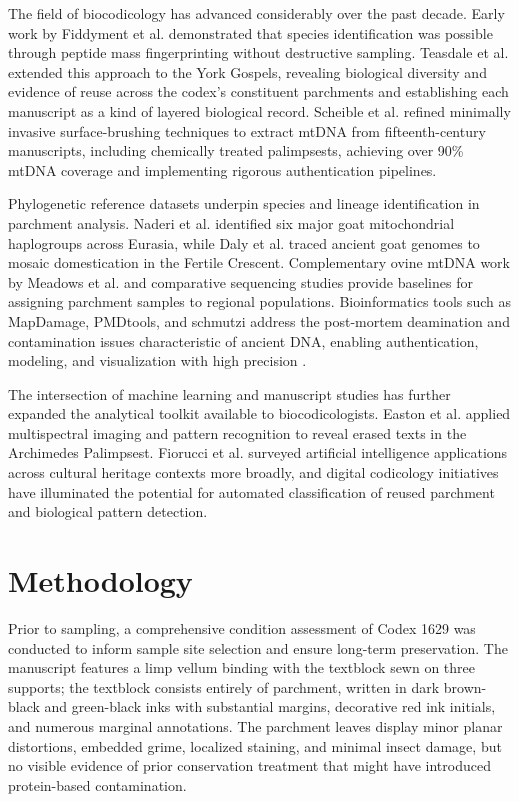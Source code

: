 \documentclass[final]{anthology-ch} %
\begin{document}
The field of biocodicology has advanced considerably over the past decade. Early work by Fiddyment et al. \cite{fiddyment2015animal} demonstrated that species identification was possible through peptide mass fingerprinting without destructive sampling. Teasdale et al. \cite{teasdale2017york} extended this approach to the York Gospels, revealing biological diversity and evidence of reuse across the codex's constituent parchments and establishing each manuscript as a kind of layered biological record. Scheible et al. \cite{scheible2024development} refined minimally invasive surface-brushing techniques to extract mtDNA from fifteenth-century manuscripts, including chemically treated palimpsests, achieving over 90\% mtDNA coverage and implementing rigorous authentication pipelines.

Phylogenetic reference datasets underpin species and lineage identification in parchment analysis. Naderi et al. \cite{naderi2007large} identified six major goat mitochondrial haplogroups across Eurasia, while Daly et al. \cite{daly2018ancient} traced ancient goat genomes to mosaic domestication in the Fertile Crescent. Complementary ovine mtDNA work by Meadows et al. \cite{meadows2007five} and comparative sequencing studies \cite{cassidy2017capturing} provide baselines for assigning parchment samples to regional populations. Bioinformatics tools such as MapDamage, PMDtools, and schmutzi address the post-mortem deamination and contamination issues characteristic of ancient DNA, enabling authentication, modeling, and visualization with high precision \cite{renaud2015schmutzi}.

The intersection of machine learning and manuscript studies has further expanded the analytical toolkit available to biocodicologists. Easton et al. \cite{easton2003multispectral} applied multispectral imaging and pattern recognition to reveal erased texts in the Archimedes Palimpsest. Fiorucci et al. \cite{fiorucci2020machine} surveyed artificial intelligence applications across cultural heritage contexts more broadly, and digital codicology initiatives \cite{stokes2009computer, schoch2013big} have illuminated the potential for automated classification of reused parchment and biological pattern detection.

\section{Methodology} \label{sec:methods}

Prior to sampling, a comprehensive condition assessment of Codex 1629 was conducted to inform sample site selection and ensure long-term preservation. The manuscript features a limp vellum binding with the textblock sewn on three supports; the textblock consists entirely of parchment, written in dark brown-black and green-black inks with substantial margins, decorative red ink initials, and numerous marginal annotations. The parchment leaves display minor planar distortions, embedded grime, localized staining, and minimal insect damage, but no visible evidence of prior conservation treatment that might have introduced protein-based contamination.
\end{document}
